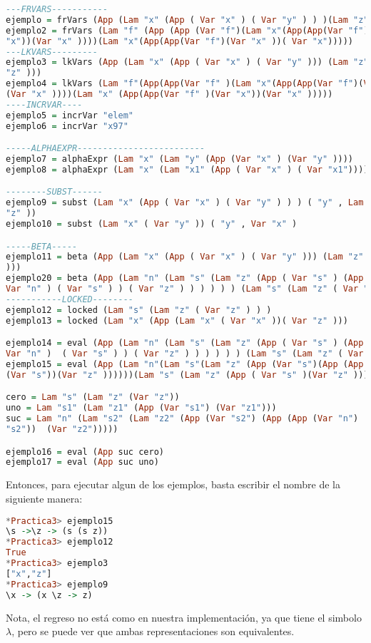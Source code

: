 \documentclass{article}
\begin{document}
\begin{lstlisting}[language=Haskell]
---FRVARS-----------
ejemplo = frVars (App (Lam "x" (App ( Var "x" ) ( Var "y" ) ) )(Lam "z" ( Var "z" ) ) )
ejemplo2 = frVars (Lam "f" (App (App (Var "f")(Lam "x"(App(App(Var "f")(Var
"x"))(Var "x" ))))(Lam "x"(App(App(Var "f")(Var "x" ))( Var "x")))))
---LKVARS---------
ejemplo3 = lkVars (App (Lam "x" (App ( Var "x" ) ( Var "y" ))) (Lam "z" ( Var
"z" )))
ejemplo4 = lkVars (Lam "f"(App(App(Var "f" )(Lam "x"(App(App(Var "f")(Var "x" ))
(Var "x" ))))(Lam "x" (App(App(Var "f" )(Var "x"))(Var "x" )))))
----INCRVAR----
ejemplo5 = incrVar "elem"
ejemplo6 = incrVar "x97"

-----ALPHAEXPR-------------------------
ejemplo7 = alphaExpr (Lam "x" (Lam "y" (App (Var "x" ) (Var "y" ))))
ejemplo8 = alphaExpr (Lam "x" (Lam "x1" (App ( Var "x" ) ( Var "x1"))))

--------SUBST------
ejemplo9 = subst (Lam "x" (App ( Var "x" ) ( Var "y" ) ) ) ( "y" , Lam "z" ( Var
"z" ))
ejemplo10 = subst (Lam "x" ( Var "y" )) ( "y" , Var "x" )

-----BETA-----
ejemplo11 = beta (App (Lam "x" (App ( Var "x" ) ( Var "y" ))) (Lam "z" ( Var "z"
)))
ejemplo20 = beta (App (Lam "n" (Lam "s" (Lam "z" (App ( Var "s" ) (App (App (
Var "n" ) ( Var "s" ) ) ( Var "z" ) ) ) ) ) ) (Lam "s" (Lam "z" ( Var "z" ) ) ) )
-----------LOCKED--------
ejemplo12 = locked (Lam "s" (Lam "z" ( Var "z" ) ) )
ejemplo13 = locked (Lam "x" (App (Lam "x" ( Var "x" ))( Var "z" )))

ejemplo14 = eval (App (Lam "n" (Lam "s" (Lam "z" (App ( Var "s" ) (App (App (
Var "n" )  ( Var "s" ) ) ( Var "z" ) ) ) ) ) ) (Lam "s" (Lam "z" ( Var "z" ) ) ) )
ejemplo15 = eval (App (Lam "n"(Lam "s"(Lam "z" (App (Var "s")(App (App (Var "n")
(Var "s"))(Var "z" ))))))(Lam "s" (Lam "z" (App ( Var "s" )(Var "z" )))))

cero = Lam "s" (Lam "z" (Var "z"))
uno = Lam "s1" (Lam "z1" (App (Var "s1") (Var "z1")))
suc = Lam "n" (Lam "s2" (Lam "z2" (App (Var "s2") (App (App (Var "n") (Var
"s2"))  (Var "z2")))))

ejemplo16 = eval (App suc cero)
ejemplo17 = eval (App suc uno)
\end{lstlisting}
Entonces, para ejecutar algun de los ejemplos, basta escribir el nombre de la siguiente manera:
\begin{lstlisting}[language=Haskell]
*Practica3> ejemplo15
\s ->\z -> (s (s z))
*Practica3> ejemplo12
True
*Practica3> ejemplo3
["x","z"]
*Practica3> ejemplo9
\x -> (x \z -> z)
\end{lstlisting}
Nota, el regreso no está como en nuestra implementación, ya que tiene el simbolo
$\lambda$, pero se puede ver que ambas representaciones son equivalentes.
\end{document}
